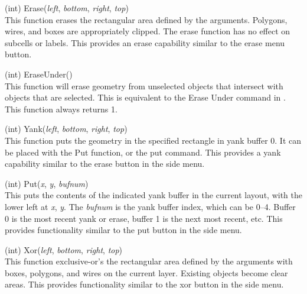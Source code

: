 \begin{description}
\item{(int) \vt Erase({\it left\/}, {\it bottom\/}, {\it right\/},
 {\it top\/})}\\
This function erases the rectangular area defined by the arguments. 
Polygons, wires, and boxes are appropriately clipped.  The erase
function has no effect on subcells or labels.  This provides an erase
capability similar to the {\cb erase} menu button.

\item{(int) \vt EraseUnder()}\\
This function will erase geometry from unselected objects that
intersect with objects that are selected.  This is equivalent to the
{\cb Erase Under} command in {\Xic}.  This function always returns 1.

\item{(int) \vt Yank({\it left\/}, {\it bottom\/}, {\it right\/},
 {\it top\/})}\\
This function puts the geometry in the specified rectangle in yank
buffer 0.  It can be placed with the {\vt Put} function, or the {\cb
put} command.  This provides a yank capability similar to the {\cb
erase} button in the side menu.

\item{(int) \vt Put({\it x\/}, {\it y\/}, {\it bufnum\/})}\\
This puts the contents of the indicated yank buffer in the current
layout, with the lower left at {\it x\/}, {\it y\/}.  The {\it bufnum\/} is
the yank buffer index, which can be 0--4.  Buffer 0 is the most recent
yank or erase, buffer 1 is the next most recent, etc.  This provides
functionality similar to the {\cb put} button in the side menu.

\item{(int) \vt Xor({\it left\/}, {\it bottom\/}, {\it right\/},
 {\it top\/})}\\
This function exclusive-or's the rectangular area defined by the
arguments with boxes, polygons, and wires on the current layer. 
Existing objects become clear areas.  This provides functionality
similar to the {\cb xor} button in the side menu.


\end{description}

